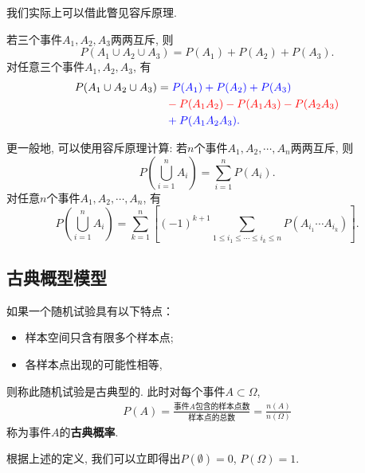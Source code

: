 \begin{asidebox}
    我们实际上可以借此瞥见容斥原理.
    \begin{remark}
        若三个事件$A_1, A_2, A_3$两两互斥, 则
        $$ P(A_1 \cup A_2 \cup A_3) = P(A_1)+P(A_2)+P(A_3).$$
        对任意三个事件$A_1, A_2, A_3$, 有
        \begin{align*}
             P(A_1 \cup A_2 \cup A_3) & =\color{blue}P(A_1)+P(A_2)+P(A_3)              \\
                                          & \phantom=\color{red}-P(A_1A_2)-P(A_1A_3)-P(A_2A_3) \\
                                          & \phantom=\color{blue}+P(A_1A_2A_3).
        \end{align*}%
    \end{remark}

    \begin{remark}
        更一般地, 可以使用容斥原理计算:
        若$n$个事件$A_1, A_2, \cdots, A_n$两两互斥, 则
        $$ P\left( \bigcup_{i=1}^n A_i \right)=\sum_{i=1}^n P(A_i).$$
        \vspace{0.2in}
        对任意$n$个事件$A_1, A_2, \cdots, A_n$, 有
        $$ P\left( \bigcup_{i=1}^n A_i \right)=\sum_{k=1}^n \left[ (-1)^{k+1} \sum_{1\le i_1\le \cdots\le i_k \le n} P(A_{i_1}\cdots A_{i_k}) \right].$$
    \end{remark}


\end{asidebox}

\subsection{古典概型模型}
\begin{definition}
    如果一个随机试验具有以下特点：
    \begin{itemize}%
        \item 样本空间只含有限多个样本点; 
        \item 各样本点出现的可能性相等, 
    \end{itemize}
    则称此随机试验是古典型的. 此时对每个事件$A\subset \Omega$, 
    \begin{align*}
        P(A)=\frac{\mbox{事件$A$包含的样本点数}}{\mbox{样本点的总数}}=\frac{n(A)}{n(\Omega)}
    \end{align*}
    称为事件$A$的\textbf{古典概率}. 
\end{definition}

根据上述的定义, 我们可以立即得出$P(\emptyset)=0$, $P(\Omega)=1$. 






